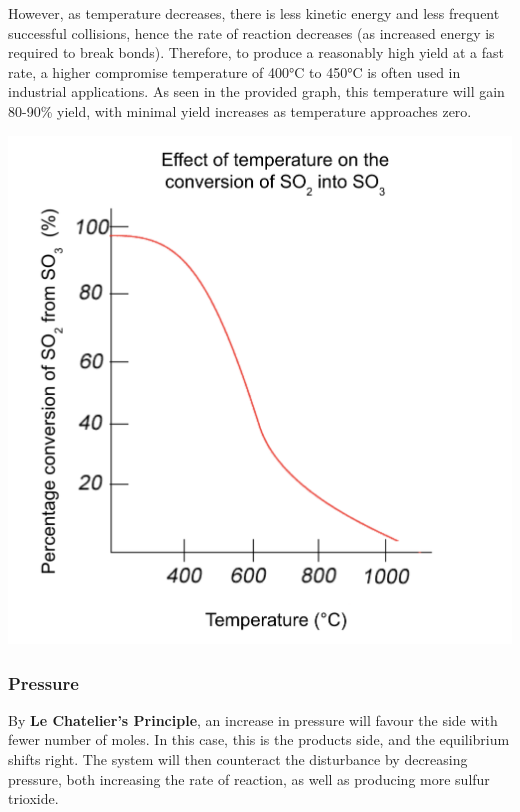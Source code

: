 \documentclass[12pt, a4paper]{article}
\begin{document}
However, as temperature decreases, there is less kinetic energy and less frequent successful collisions, hence the rate of reaction decreases (as increased energy is required to break bonds). Therefore, to produce a reasonably high yield at a fast rate, a higher compromise temperature of 400°C to 450°C is often used in industrial applications. As seen in the provided graph, this temperature will gain 80-90\% yield, with minimal yield increases as temperature approaches zero.

\begin{center}
\includegraphics[scale=0.5]{graph}
\end{center}






\subsubsection{Pressure}

By \textbf{Le Chatelier's Principle}, an increase in pressure will favour the side with fewer number of moles. In this case, this is the products side, and the equilibrium shifts right. The system will then counteract the disturbance by decreasing pressure, both increasing the rate of reaction, as well as producing more sulfur trioxide.
\end{document}
